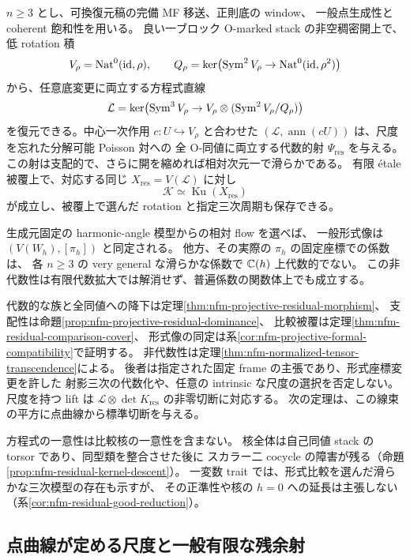 \begin{maintheorem}
$n\ge3$ とし、可換復元稿の完備 MF 移送、正則底の window、
一般点生成性と coherent 飽和性を用いる。
良い一ブロック O-marked stack の非空稠密開上で、低 rotation 積
\[
 V_\rho=\operatorname{Nat}^0(\mathrm{id},\rho),\qquad
 Q_\rho=\ker\bigl(\operatorname{Sym}^2V_\rho\to
              \operatorname{Nat}^0(\mathrm{id},\rho^2)\bigr)
\]
から、任意底変更に両立する方程式直線
\[
 \mathcal L=\ker\bigl(\operatorname{Sym}^3V_\rho\to
       V_\rho\otimes(\operatorname{Sym}^2V_\rho/Q_\rho)\bigr)
\]
を復元できる。中心一次作用 $c:U\hookrightarrow V_\rho$ と合わせた
$(\mathcal L,\operatorname{ann}(cU))$ は、尺度を忘れた分解可能 Poisson 対への
全 O-同値に両立する代数的射 $\Psi_{\mathrm{res}}$ を与える。
この射は支配的で、さらに開を縮めれば相対次元一で滑らかである。
有限 \'etale 被覆上で、対応する同じ $X_{\mathrm{res}}=V(\mathcal L)$ に対し
\[
 \mathcal K\simeq\operatorname{Ku}(X_{\mathrm{res}})
\]
が成立し、被覆上で選んだ rotation と指定三次周期も保存できる。

生成元固定の harmonic-angle 模型からの相対 flow を選べば、
一般形式像は $(V(W_h),[\pi_h])$ と同定される。
他方、その実際の $\pi_h$ の固定座標での係数は、
各 $n\ge3$ の very general な滑らかな係数で $\mathbb C(h)$ 上代数的でない。
この非代数性は有限代数拡大では解消せず、普遍係数の関数体上でも成立する。
\end{maintheorem}

代数的な族と全同値への降下は定理\ref{thm:nfm-projective-residual-morphism}、
支配性は命題\ref{prop:nfm-projective-residual-dominance}、
比較被覆は定理\ref{thm:nfm-residual-comparison-cover}、
形式像の同定は系\ref{cor:nfm-projective-formal-compatibility}で証明する。
非代数性は定理\ref{thm:nfm-normalized-tensor-transcendence}による。
後者は指定された固定 frame の主張であり、形式座標変更を許した
射影三次の代数化や、任意の intrinsic な尺度の選択を否定しない。
尺度を持つ lift は $\mathcal L\otimes\det K_{\mathrm{res}}$ の非零切断に対応する。
次の定理は、この線束の平方に点曲線から標準切断を与える。

方程式の一意性は比較核の一意性を含まない。
核全体は自己同値 stack の torsor であり、同型類を整合させた後に
スカラー二 cocycle の障害が残る（命題\ref{prop:nfm-residual-kernel-descent}）。
一変数 trait では、形式比較を選んだ滑らかな三次模型の存在も示すが、
その正準性や核の $h=0$ への延長は主張しない
（系\ref{cor:nfm-residual-good-reduction}）。

\subsection{点曲線が定める尺度と一般有限な残余射}

